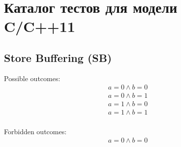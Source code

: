 \newcommand{\lbJoinTemplate}[4]{
\begin{minipage}[t]{0.3\linewidth}
\vspace{-.2cm}
\begin{equation*}
\begin{tabular}{c}
  $\writeInstParam{\rlx}{x}{0}; \writeInstParam{\rlx}{y}{0};$ \\
\begin{tabular}{L || L || L || L}
  \readInstParam{#1}{a}{y}; & \skipc & \readInstParam{#3}{b}{x}; & \skipc \\
  \writeInstParam{\rlx}{z1}{a} & & \writeInstParam{\rlx}{z2}{b} &  \\
  \multicolumn{2}{c ||}{$\writeInstParam{#2}{x}{1}$} &
  \multicolumn{2}{c}{$\writeInstParam{#4}{y}{1}$} \\
\end{tabular}
\end{tabular}
\end{equation*}
\end{minipage}
}

\chapter{Каталог тестов для модели C/C++11}
\label{sec:litmusTests}

\section{Store Buffering (SB)}
\label{app:sb}

%
\begin{minipage}[t]{0.3\linewidth}
Possible outcomes:\\
\[\begin{array}{l}
a = 0 \land b = 0\\
a = 0 \land b = 1\\
a = 1 \land b = 0\\
a = 1 \land b = 1\\
\end{array}\]
\end{minipage}
%
\sbTemplate{\rel}{\rel}{\rel}{\acq}{\rel}{\acq}
\litmusTestEnd


\begin{minipage}[t]{0.3\linewidth}
Forbidden outcomes:\\
\[\begin{array}{l}
a = 0 \land b = 0\\
\end{array}\]
\end{minipage}
%
\sbTemplate{\sco}{\sco}{\sco}{\sco}{\sco}{\sco}
\litmusTestEnd

